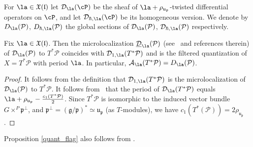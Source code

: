 \documentclass[12pt]{amsart}
\begin{document}
For $\la \in \mathfrak{X}(\mathfrak{l})$ let $\mathcal{D}_{\la}(\cP)$ be the sheaf of $\la+\rho_{\mathfrak{u}_{\mathfrak{p}}}$-twisted differential operators on $\cP$, and let $\mathcal{D}_{\hbar, \la}(\cP)$ be its homogeneous version. We denote by $D_\la(\mathcal{P})$, $D_{\hbar,\la}(\mathcal{P})$ the global sections of $\mathcal{D}_\la(\mathcal{P})$, $\mathcal{D}_{\hbar,\la}(\mathcal{P})$ respectively.
\begin{prop}\label{quant_flag}
	Fix $\la \in \mathfrak{X}(\mathfrak{l})$. Then the microlocalization $\underline{\mathcal{D}}_\la(\mathcal{P})$ (see~\cite[Section~4.1]{BPW} and references therein) of
	$\mathcal{D}_\la(\mathcal{P})$ to $T^*\mathcal{P}$ coincides with $\mathcal{D}_{1,\la}(T^*\mathcal{P})$ and is the filtered quantization of $X=T^*\mathcal{P}$ 
	with period $\la$. In particular, $\mathcal{A}_{\la}(T^*\mathcal{P})=D_\la(\mathcal{P})$. 
	\end{prop}
	\begin{proof}
 It follows from the definition that $\mathcal{D}_{1,\la}(T^*\mathcal{P})$ is the microlocalization of $\mathcal{D}_\la(\mathcal{P})$ to $T^*\mathcal{P}$.
	It follows from~\cite[Proposition~4.4]{BPW} that the period of $\mathcal{D}_\la(T^*\mathcal{P})$ equals  $\la+\rho_{\mathfrak{u}_{\mathfrak{p}}}-\frac{c_1(T^*\mathcal{P})}{2}$. Since $T^*\mathcal{P}$ is isomorphic to the induced vector bundle $G \times^{P} \mathfrak{p}^{\perp}$, and $\mathfrak{p}^{\perp}=(\mathfrak{g}/\mathfrak{p})^* \simeq \mathfrak{u}_{\mathfrak{p}}$ (as $T$-modules), we have $c_1(T^*(\mathcal{P}))=2\rho_{\mathfrak{u}_{\mathfrak{p}}}$. 
	\end{proof}

\begin{rmk}
Proposition \ref{quant_flag} also follows from \cite[Theorem 5.4.1]{Losev_isofquant}.    
\end{rmk}
\end{document}
